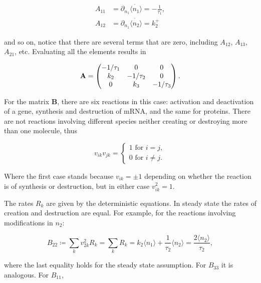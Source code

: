 \begin{equation*}
  \begin{split}
    A_{11} &= \partial_{n_1}\dot{\langle n_1\rangle} = -\frac{1}{\tau_1},\\
    A_{12} &= \partial_{n_1}\dot{\langle n_2\rangle} = k_2^+
  \end{split}
\end{equation*}

and so on, notice that there are several terms that are zero, including $A_{12}$, $A_{13}$, $A_{21}$, etc. Evaluating all the elements results in

\begin{equation}
  \label{eq:fdt-A}
  \mathbf{A} = \begin{pmatrix}
    -1/\tau_1 & 0 & 0 \\
    k_2 & -1/\tau_2 & 0 \\
    0 & k_3 & -1/\tau_3
  \end{pmatrix}.\\
\end{equation}

For the matrix $\mathbf{B}$, there are six reactions in this case: activation and deactivation of a gene, synthesis and destruction of mRNA, and the same for proteins. There are not reactions involving different species neither creating or destroying more than one molecule, thus

\begin{equation*}
  v_{ik}v_{jk} = 
  \begin{cases}
    1 \text{ for } i = j,\\
    0 \text{ for } i\neq j.
  \end{cases}
\end{equation*}

Where the first case stands because  $v_{ik} =\pm 1$ depending on whether the reaction is of synthesis or destruction, but in either case $v_{ik}^2 = 1$.

The rates $R_k$ are given by the deterministic equations. In steady state the rates of creation and destruction are equal. For example, for the reactions involving modifications in $n_2$:

\begin{equation*}
  B_{22} \coloneqq \sum_kv_{2k}^2R_k = \sum_kR_k = k_2\langle n_1\rangle + \frac{1}{\tau_2}\langle n_2\rangle = \frac{2\langle n_2\rangle}{\tau_2},
\end{equation*}

where the last equality holds for the steady state assumption. For $B_{33}$ it is analogous. For $B_{11}$,

